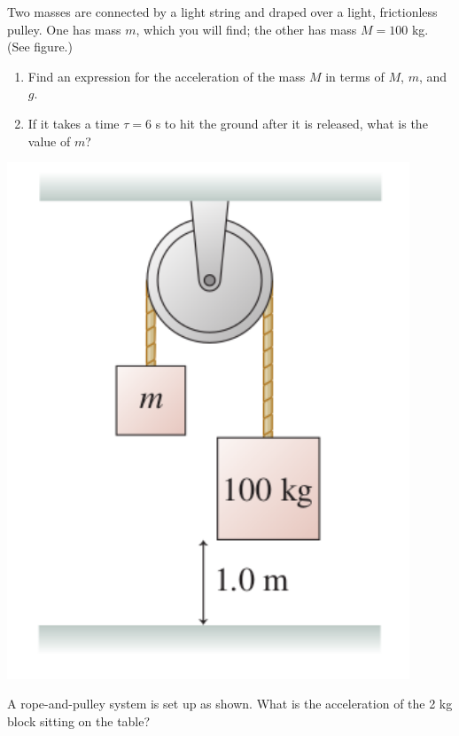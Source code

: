 \documentclass[12pt]{article}
\begin{document}
\begin{enumerate}
\bigskip

  \begin{minipage}{0.7\textwidth}
\item Two masses are connected by a light string and draped over a light, frictionless pulley. One has mass $m$, which you will find; the other has mass $M=100$ kg. (See figure.)
   
\begin{enumerate}
\item Find an expression for the acceleration of the mass $M$ in terms of $M$, $m$,
and $g$.
\item If it takes a time $\tau=6$ s to hit the ground after it is released, what is
the value of $m$? 
\end{enumerate}
  \end{minipage}
  \begin{minipage}{0.3\textwidth}
\centerline{\includegraphics[width=0.9\textwidth]{problem738.png}}
  \end{minipage}


\bigskip

  \begin{minipage}{0.6\textwidth}
\item A rope-and-pulley system is set up as shown. What is the acceleration of the 
2 kg block sitting on the table? 
   

\end{minipage}
\end{enumerate}
\end{document}
